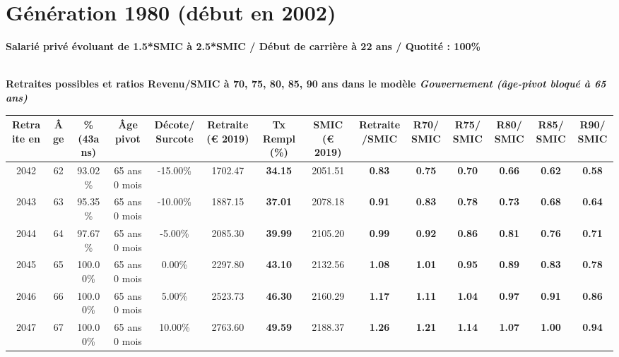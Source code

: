 \section{Génération 1980 (début en 2002)\label{Ascendant1525_100_22_1980_0}} 
 
{\bf \noindent Salarié privé évoluant de 1.5*SMIC à 2.5*SMIC / Début de carrière à 22 ans / Quotité : 100\%}  ~ 

 ~\\{\bf \noindent Retraites possibles et ratios Revenu/SMIC à 70, 75, 80, 85, 90 ans dans le modèle \emph{Gouvernement (âge-pivot bloqué à 65 ans)}}  
 
\begin{adjustbox}{max width=\textwidth} 
\begin{tabular}[htb]{|c|c||c|c|c||c|c||c|c||c|c|c|c|c|} 
\hline 
 Retraite en &  Âge &  \%(43ans) &  Âge pivot &  Décote/Surcote &  Retraite (\euro{} 2019) &  Tx Rempl(\%) &  SMIC (\euro{} 2019) &  Retraite/SMIC &  R70/SMIC &  R75/SMIC &  R80/SMIC &  R85/SMIC &  R90/SMIC \\ 
\hline \hline 
 2042 &  62 &  93.02\% &  65 ans 0 mois &  -15.00\% &  1702.47 &  {\bf 34.15} &  2051.51 &  {\bf {\color{red} 0.83}} &  {\bf {\color{red} 0.75}} &  {\bf {\color{red} 0.70}} &  {\bf {\color{red} 0.66}} &  {\bf {\color{red} 0.62}} &  {\bf {\color{red} 0.58}} \\ 
\hline 
 2043 &  63 &  95.35\% &  65 ans 0 mois &  -10.00\% &  1887.15 &  {\bf 37.01} &  2078.18 &  {\bf {\color{red} 0.91}} &  {\bf {\color{red} 0.83}} &  {\bf {\color{red} 0.78}} &  {\bf {\color{red} 0.73}} &  {\bf {\color{red} 0.68}} &  {\bf {\color{red} 0.64}} \\ 
\hline 
 2044 &  64 &  97.67\% &  65 ans 0 mois &  -5.00\% &  2085.30 &  {\bf 39.99} &  2105.20 &  {\bf {\color{red} 0.99}} &  {\bf {\color{red} 0.92}} &  {\bf {\color{red} 0.86}} &  {\bf {\color{red} 0.81}} &  {\bf {\color{red} 0.76}} &  {\bf {\color{red} 0.71}} \\ 
\hline 
 2045 &  65 &  100.00\% &  65 ans 0 mois &  0.00\% &  2297.80 &  {\bf 43.10} &  2132.56 &  {\bf 1.08} &  {\bf 1.01} &  {\bf {\color{red} 0.95}} &  {\bf {\color{red} 0.89}} &  {\bf {\color{red} 0.83}} &  {\bf {\color{red} 0.78}} \\ 
\hline 
 2046 &  66 &  100.00\% &  65 ans 0 mois &  5.00\% &  2523.73 &  {\bf 46.30} &  2160.29 &  {\bf 1.17} &  {\bf 1.11} &  {\bf 1.04} &  {\bf {\color{red} 0.97}} &  {\bf {\color{red} 0.91}} &  {\bf {\color{red} 0.86}} \\ 
\hline 
 2047 &  67 &  100.00\% &  65 ans 0 mois &  10.00\% &  2763.60 &  {\bf 49.59} &  2188.37 &  {\bf 1.26} &  {\bf 1.21} &  {\bf 1.14} &  {\bf 1.07} &  {\bf 1.00} &  {\bf {\color{red} 0.94}} \\ 
\hline 
\hline 
\end{tabular} 
\end{adjustbox} 
 
